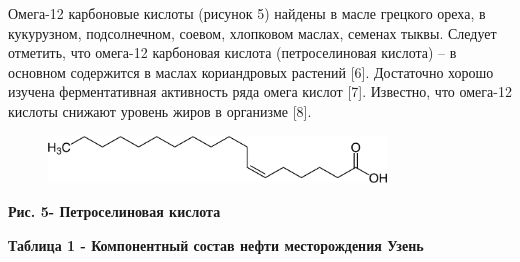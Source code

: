 Омега-12 карбоновые кислоты (рисунок 5) найдены в масле грецкого ореха,
в кукурузном, подсолнечном, соевом, хлопковом маслах, семенах тыквы.
Следует отметить, что омега-12 карбоновая кислота (петроселиновая
кислота) -- в основном содержится в маслах кориандровых растений
{[}6{]}. Достаточно хорошо изучена ферментативная активность ряда омега
кислот {[}7{]}. Известно, что омега-12 кислоты снижают уровень жиров в
организме {[}8{]}.

\begin{figure}[H]
	\centering
	\includegraphics[width=0.8\textwidth]{assets/372}
	\caption*{}
\end{figure}

{\bfseries Рис. 5- Петроселиновая кислота}

{\bfseries Таблица 1 - Компонентный состав нефти месторождения Узень}

